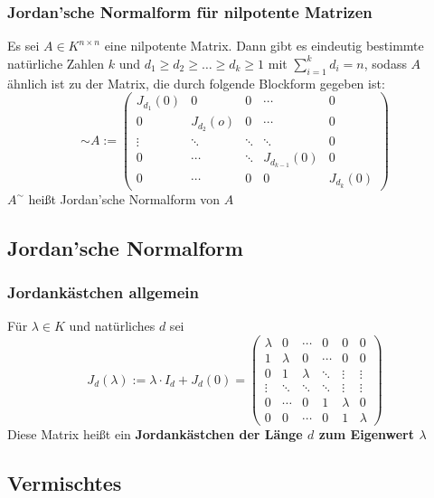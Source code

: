 \documentclass{kit}
\begin{document}
    \subsubsection{Jordan'sche Normalform für nilpotente Matrizen}
      Es sei $A\in K^{n\times n}$ eine nilpotente Matrix. Dann gibt es eindeutig bestimmte natürliche Zahlen $k$ und 
      $d_1\ge d_2\ge\dots\ge d_k\ge 1$ mit $\sum_{i=1}^kd_i=n$, sodass $A$ ähnlich ist zu der Matrix, die durch folgende
      Blockform gegeben ist:
      $$\sim A:=\begin{pmatrix}
        J_{d_1}(0) & 0 & 0 & \cdots & 0 \\
        0 & J_{d_2}(o) & 0 & \cdots & 0 \\
        \vdots & \ddots & \ddots & \ddots & 0 \\
        0 & \cdots & \ddots & J_{d_{k-1}}(0) & 0 \\
        0 & \cdots & 0 & 0 & J_{d_k}(0)
      \end{pmatrix}$$
      $A^\sim$  heißt Jordan'sche Normalform von $A$
  \subsection{Jordan'sche Normalform}
    \subsubsection{Jordankästchen allgemein}
      Für $\lambda\in K$ und natürliches $d$ sei
      $$J_d(\lambda):=\lambda\cdot I_d+J_d(0)=\begin{pmatrix}
        \lambda & 0 & \cdots & 0 & 0 & 0 \\
        1 & \lambda & 0 & \cdots & 0 & 0 \\
        0 & 1 & \lambda & \ddots & \vdots & \vdots \\
        \vdots & \ddots & \ddots & \ddots & \vdots & \vdots \\
        0 & \cdots & 0 & 1 & \lambda & 0 \\
        0 & 0 & \cdots & 0 & 1 & \lambda
      \end{pmatrix}$$
      Diese Matrix heißt ein \textbf{Jordankästchen der Länge $d$ zum Eigenwert $\lambda$}
  \subsection{Vermischtes}
\end{document}

